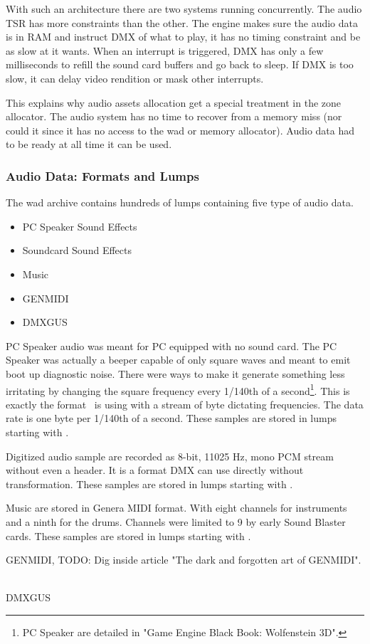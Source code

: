 With such an architecture there are two systems running concurrently. The audio TSR has more constraints than the other. The engine makes sure the audio data is in RAM and instruct DMX of what to play, it has no timing constraint and be as slow at it wants. When an interrupt is triggered, DMX has only a few milliseconds to refill the sound card buffers and go back to sleep. If DMX is too slow, it can delay video rendition or mask other interrupts.\\
\par
 This explains why audio assets allocation get a special treatment in the zone allocator. The audio system has no time to recover from a memory miss (nor could it since it has no access to the wad or memory allocator). Audio data had to be ready at all time it can be used.

\subsubsection{Audio Data: Formats and Lumps}
The wad archive contains hundreds of lumps containing five type of audio data.
\begin{itemize}
  \item PC Speaker Sound Effects
  \item Soundcard Sound Effects
  \item Music
  \item GENMIDI
  \item DMXGUS
\end{itemize}
\par
PC Speaker audio was meant for PC equipped with no sound card. The PC Speaker was actually a beeper capable of only square waves and meant to emit boot up diagnostic noise. There were ways to make it generate something less irritating by changing the square frequency every 1/140th of a second\footnote{PC Speaker are detailed in "Game Engine Black Book: Wolfenstein 3D".}. This is exactly the format \doom~is using with a stream of byte dictating frequencies. The data rate is one byte per 1/140th of a second. These samples are stored in lumps starting with .\\
\par
 Digitized audio sample are recorded as 8-bit, 11025 Hz, mono PCM stream without even a header. It is a format DMX can use directly without transformation.  These samples are stored in lumps starting with .\\
\par
Music are stored in Genera MIDI format. With eight channels for instruments and a ninth for the drums. Channels were limited to 9 by early Sound Blaster cards. These samples are stored in lumps starting with .\\
\par
GENMIDI, TODO: Dig inside article "The dark and forgotten art of GENMIDI".\\\\
\par
DMXGUS\\
\par
\pagebreak



